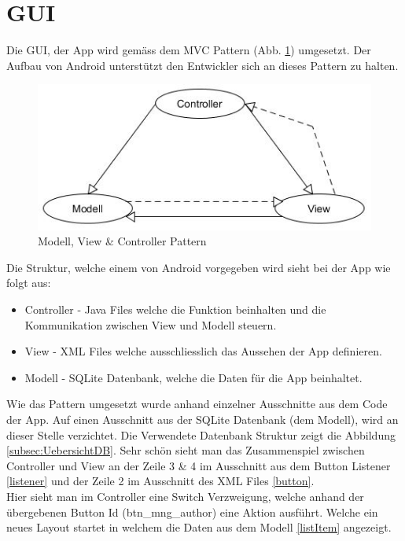 \section{GUI}
\label{sec:GUIumsetzung}

Die GUI, der App wird gemäss dem MVC Pattern (Abb. \ref{fig:MVC}) umgesetzt. Der Aufbau von Android unterstützt den Entwickler sich an dieses Pattern zu halten.

\begin{figure}[htbp]
	\centering
	\includegraphics[scale=0.6]{pic/MVC}
	\caption{Modell, View \& Controller Pattern}
	\label{fig:MVC}
\end{figure}

Die Struktur, welche einem von Android vorgegeben wird sieht bei der App wie folgt aus:

\begin{itemize}
	\item Controller - Java Files welche die Funktion beinhalten und die Kommunikation zwischen View und Modell steuern.
	\item View - XML Files welche ausschliesslich das Aussehen der App definieren.
	\item Modell - SQLite Datenbank, welche die Daten für die App beinhaltet.
\end{itemize}

Wie das Pattern umgesetzt wurde anhand einzelner Ausschnitte aus dem Code der App. Auf einen Ausschnitt aus der SQLite Datenbank (dem Modell), wird an dieser Stelle verzichtet. Die Verwendete Datenbank Struktur zeigt die Abbildung \ref{subsec:UebersichtDB}. Sehr schön sieht man das Zusammenspiel zwischen Controller und View an der Zeile 3 \& 4 im Ausschnitt aus dem Button Listener \ref{listener} und der Zeile 2 im Ausschnitt des XML Files \ref{button}.\\

Hier sieht man im Controller eine Switch Verzweigung, welche anhand der übergebenen Button Id (btn\_mng\_author) eine Aktion ausführt. Welche ein neues Layout startet in welchem die Daten aus dem Modell \ref{listItem} angezeigt. 





